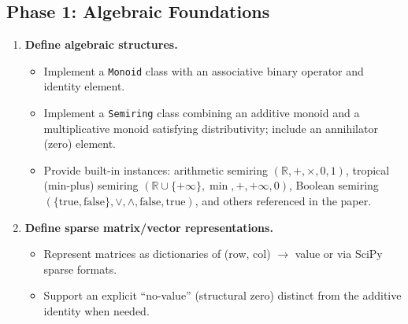 \documentclass[11pt,a4paper]{article}
\begin{document}
\subsection{Phase 1: Algebraic Foundations}
\begin{enumerate}[label=\textbf{1.\arabic*}]
  \item \textbf{Define algebraic structures.}
    \begin{itemize}
      \item Implement a \texttt{Monoid} class with an associative binary operator and identity element.
      \item Implement a \texttt{Semiring} class combining an additive monoid and a multiplicative monoid satisfying distributivity; include an annihilator (zero) element.
      \item Provide built-in instances: arithmetic semiring $(\mathbb{R}, +, \times, 0, 1)$, tropical (min-plus) semiring $(\mathbb{R}\cup\{+\infty\}, \min, +, +\infty, 0)$, Boolean semiring $(\{\text{true},\text{false}\}, \lor, \land, \text{false}, \text{true})$, and others referenced in the paper.
    \end{itemize}
  \item \textbf{Define sparse matrix/vector representations.}
    \begin{itemize}
      \item Represent matrices as dictionaries of (row, col) $\to$ value or via SciPy sparse formats.
      \item Support an explicit ``no-value'' (structural zero) distinct from the additive identity when needed.
    \end{itemize}
\end{enumerate}
\end{document}
